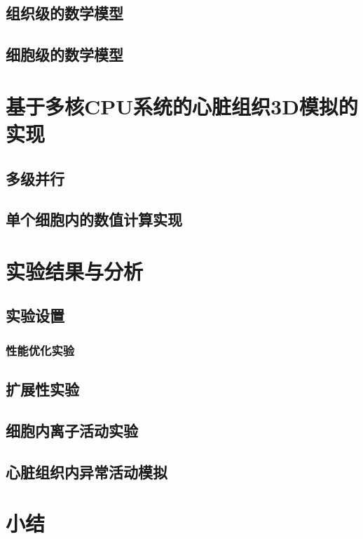 \subsection{组织级的数学模型}

\subsection{细胞级的数学模型}


\section{基于多核CPU系统的心脏组织3D模拟的实现}

 \subsection{多级并行}
 
 \subsection{单个细胞内的数值计算实现}




\section{实验结果与分析}
\subsection{实验设置}

\subsubsection{性能优化实验}

\subsection{扩展性实验}

\subsection{细胞内离子活动实验}

\subsection{心脏组织内异常活动模拟}

\section{小结}



















